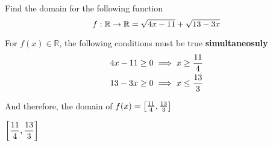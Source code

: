 

\question[2] Find the domain for the following function 
\[
  f:\mathbb{R}\rightarrow\mathbb{R} = \sqrt{4 x - 11} + \sqrt{13 - 3 x}
\]

\watchout

\begin{solution}[\mcq]
  For $f(x)\in\mathbb{R}$, the following conditions must be true \textbf{simultaneosuly}
  \begin{align}
    4 x - 11 \geq 0 &\implies x\geq\frac{11}{4} \\
    13 - 3 x \geq 0 &\implies x\leq\frac{13}{3}
  \end{align}

  And therefore, the domain of $f(x)=\left[ \frac{11}{4}, \frac{13}{3} \right]$
\end{solution}

\ifprintanswers
  \begin{codex}
    $\left[ \dfrac{11}{4}, \dfrac{13}{3} \right]$
  \end{codex}
\fi
